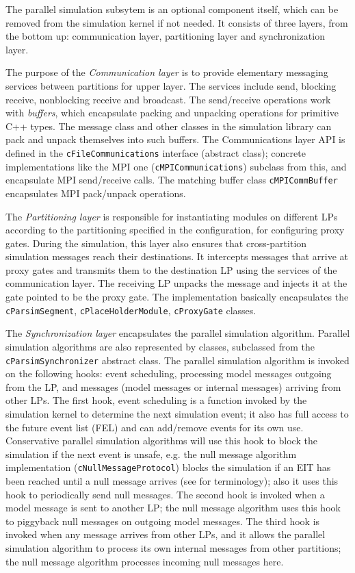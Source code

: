 The parallel simulation subsytem is an optional component
itself, which can be removed from the simulation kernel
if not needed. It consists of three layers, from the bottom up:
communication layer, partitioning layer and synchronization layer.

The purpose of the \textit{Communication layer} is to
provide elementary messaging services between partitions for
upper layer. The services include send, blocking receive,
nonblocking receive and broadcast. The send/receive operations
work with \textit{buffers}, which encapsulate packing and unpacking
operations for primitive C++ types. The message class and
other classes in the simulation library can pack and unpack
themselves into such buffers. The Communications layer API
is defined in the \texttt{cFileCommunications} interface
(abstract class); concrete implementations like the MPI
one (\texttt{cMPICommunications}) subclass from this,
and encapsulate MPI send/receive calls. The matching buffer
class \texttt{cMPICommBuffer} encapsulates MPI pack/unpack
operations.

The \textit{Partitioning layer} is responsible for instantiating
modules on different LPs according to the partitioning specified
in the configuration, for configuring proxy gates.
During the simulation, this layer also ensures that cross-partition
simulation messages reach their destinations. It intercepts messages
that arrive at proxy gates and transmits them to the destination LP
using the services of the communication layer. The receiving LP
unpacks the message and injects it at the gate pointed to be the
proxy gate. The implementation basically encapsulates the
\texttt{cParsimSegment}, \texttt{cPlaceHolderModule},
\texttt{cProxyGate} classes.

The \textit{Synchronization layer} encapsulates the parallel
simulation algorithm. Parallel simulation algorithms are also represented
by classes, subclassed from the \texttt{cParsimSynchronizer} abstract class.
The parallel simulation algorithm is invoked on the following hooks:
event scheduling, processing model messages outgoing from the LP,
and messages (model messages or internal messages) arriving
from other LPs. The first hook, event scheduling is a function
invoked by the simulation kernel to determine the next simulation
event; it also has full access to the future event list (FEL) and
can add/remove events for its own use.
Conservative parallel simulation algorithms will use this hook
to block the simulation if the next event is unsafe, e.g. the
null message algorithm implementation (\texttt{cNullMessageProtocol})
blocks the simulation if an EIT has been reached until a null message
arrives (see \cite{bagrodia00} for terminology); also it uses
this hook to periodically send null messages. The second hook
is invoked when a model message is sent to another LP;
the null message algorithm uses this hook to piggyback null
messages on outgoing model messages. The third hook is invoked
when any message arrives from other LPs, and it allows the
parallel simulation algorithm to process its own internal messages
from other partitions; the null message algorithm processes
incoming null messages here.

